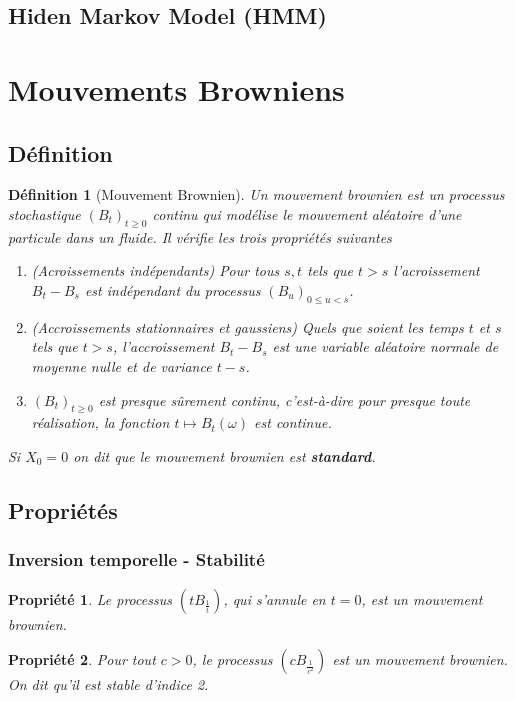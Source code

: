 \documentclass[a4paper]{article}
\newtheorem{propriete}{Propriété}[theorem]
\newtheorem{definition}{Définition}
\begin{document}
\subsection{Hiden Markov Model (HMM)}


\section{Mouvements Browniens}
\subsection{Définition}
\begin{definition}[Mouvement Brownien]
Un mouvement brownien est un processus stochastique $(B_t)_{t\geq 0}$ continu qui modélise le mouvement aléatoire d'une particule dans un fluide. Il vérifie les trois propriétés suivantes
\begin{enumerate}[label=\textit{(\roman*)}]
    \item (Acroissements indépendants) Pour tous $s, t$ tels que $t >s$ l'acroissement $B_t-B_s$ est indépendant du processus $(B_u)_{0\leq u<s}$.
    \item (Accroissements stationnaires et gaussiens) Quels que soient les temps $t$ et $s$ tels que $t > s$, l'accroissement $B_{t} - B_{s}$ est une variable aléatoire normale de moyenne nulle et de variance $t − s$.
    \item $(B_{t})_{t\geq 0}$ est presque sûrement continu, c'est-à-dire pour presque toute réalisation, la fonction $t\mapsto B_{t}(\omega )$ est continue.
\end{enumerate}
Si $X_0=0$ on dit que le mouvement brownien est \textbf{standard}.
\end{definition}
\subsection{Propriétés}
\subsubsection{Inversion temporelle - Stabilité}
\begin{propriete}
    Le processus $(tB_{\frac{1}{t}})$, qui s'annule en $t=0$, est un mouvement brownien. \\
\end{propriete}
\begin{propriete}
    Pour tout $c>0$, le processus $(cB_{\frac{1}{c^2}})$ est un mouvement brownien. On dit qu'il est stable d'indice 2.
\end{propriete}
\end{document}
